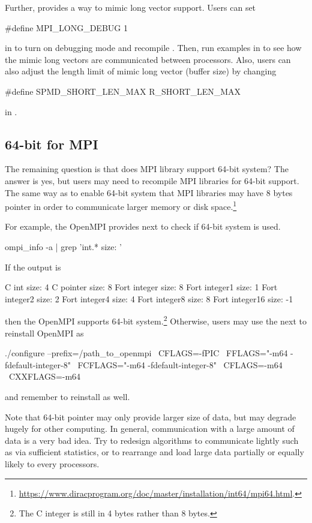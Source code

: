Further,  provides a way to mimic long vector support.
Users can set 
\begin{Command}[title=pkg\_constant.h,language=C]
#define MPI_LONG_DEBUG 1
\end{Command}
in 
to turn on debugging mode and recompile . Then, run examples in
 to see how the mimic
long vectors are communicated between processors. Also, users can also adjust
the length limit of mimic long vector (buffer size)
by changing
\begin{Command}[title=spmd.h,language=C]
#define SPMD_SHORT_LEN_MAX R_SHORT_LEN_MAX
\end{Command}
in .


\subsection{64-bit for MPI}

The remaining question is that does MPI library support 64-bit system?
The answer is yes, but users may need to recompile MPI libraries for
64-bit support.
The same way as  to enable 64-bit system that MPI libraries
may have 8 bytes pointer in order to communicate larger memory or disk
space.\footnote{
\url{https://www.diracprogram.org/doc/master/installation/int64/mpi64.html}.
}

For example, the OpenMPI provides next to check if 64-bit system is used.
\begin{Command}
ompi_info -a | grep 'int.* size: '
\end{Command}
If the output is
\begin{Command}
              C int size: 4
          C pointer size: 8
       Fort integer size: 8
      Fort integer1 size: 1
      Fort integer2 size: 2
      Fort integer4 size: 4
      Fort integer8 size: 8
     Fort integer16 size: -1
\end{Command}
then the OpenMPI supports 64-bit system.\footnote{
\color{red}
The C integer is still in 4 bytes rather than 8 bytes.
}
Otherwise, users may use the next to reinstall OpenMPI as
\begin{Command}
./configure --prefix=/path_to_openmpi \
            CFLAGS=-fPIC \
            FFLAGS="-m64 -fdefault-integer-8" \
            FCFLAGS="-m64 -fdefault-integer-8" \
            CFLAGS=-m64 \
            CXXFLAGS=-m64
\end{Command}
and remember to reinstall \pkg{pbdMPI} as well.

Note that 64-bit pointer may only provide larger size of data, but
may degrade hugely for other computing. In general, communication with a
large amount of data is a very bad idea. Try to redesign algorithms to
communicate lightly such as via sufficient statistics, or to rearrange and
load large data partially or equally likely to every processors.
